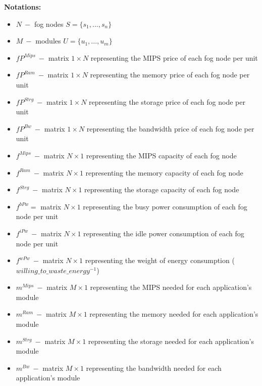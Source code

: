 \documentclass{article}
\begin{document}
\pagebreak
\noindent\textbf{Notations:}
\begin{itemize}
	\item $N~-$ fog nodes $S=\{s_1, ..., s_n\}$
	\item $M~-$ modules $U=\{u_1, ..., u_m\}$\\
	
	\item $fP^{Mips}~-$ matrix $1\times N$ representing the MIPS price of each fog node per unit
	\item $fP^{Ram}~-$ matrix $1\times N$ representing the memory price of each fog node per unit
	\item $fP^{Strg}~-$ matrix $1\times N$ representing the storage price of each fog node per unit
	\item $fP^{Bw}~-$ matrix $1\times N$ representing the bandwidth price of each fog node per unit\\
	
	\item $f^{Mips}~-$ matrix $N\times 1$ representing the MIPS capacity of each fog node
	\item $f^{Ram}~-$ matrix $N\times 1$ representing the memory capacity of each fog node
	\item $f^{Strg}~-$ matrix $N\times 1$ representing the storage capacity of each fog node
	\item $f^{bPw}=$ matrix $N\times 1$ representing the busy power consumption of each fog node per unit
	\item $f^{iPw}~-$ matrix $N\times 1$ representing the idle power consumption of each fog node per unit
	\item $f^{wPw}~-$ matrix $N\times 1$ representing the weight of energy consumption ($willing\_to\_waste\_energy^{-1}$)\\
	
	\item $m^{Mips}~-$ matrix $M\times 1$ representing the MIPS needed for each application's module
	\item $m^{Ram}~-$ matrix $M\times 1$ representing the memory needed for each application's module
	\item $m^{Strg}~-$ matrix $M\times 1$ representing the storage needed for each application's module
	\item $m^{Bw}~-$ matrix $M\times 1$ representing the bandwidth needed for each application's module\\
	

\end{itemize}
\end{document}

